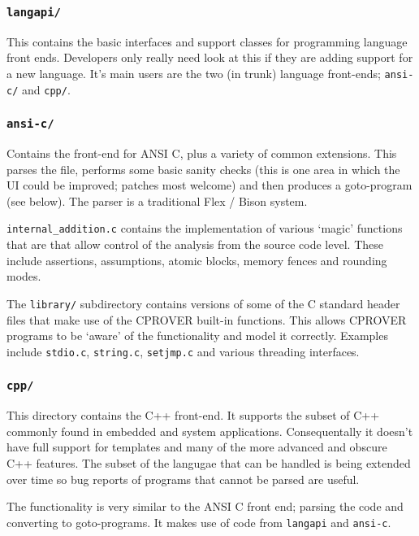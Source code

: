 \documentclass{article}
\newcommand{\dir}[1]{\texttt{#1}}
\newcommand{\file}[1]{\texttt{#1}}
\begin{document}
\subsubsection{\dir{langapi/}}

This contains the basic interfaces and support classes for programming
language front ends.  Developers only really need look at this if they
are adding support for a new language.  It's main users are the two
(in trunk) language front-ends; \dir{ansi-c/} and \dir{cpp/}.


\subsubsection{\dir{ansi-c/}}

Contains the front-end for ANSI C, plus a variety of common
extensions.  This parses the file, performs some basic sanity checks
(this is one area in which the UI could be improved; patches most
welcome) and then produces a goto-program (see below).  The parser is
a traditional Flex / Bison system.  

\file{internal\_addition.c} contains the implementation of various
`magic' functions that are that allow control of the analysis from the
source code level.  These include assertions, assumptions, atomic
blocks, memory fences and rounding modes.

The \dir{library/} subdirectory contains versions of some of the C
standard header files that make use of the CPROVER built-in
functions.  This allows CPROVER programs to be `aware' of the
functionality and model it correctly.  Examples include
\file{stdio.c}, \file{string.c}, \file{setjmp.c} and various threading
interfaces.


\subsubsection{\dir{cpp/}}

This directory contains the C++ front-end.  It supports the subset of
C++ commonly found in embedded and system applications.
Consequentally it doesn't have full support for templates and many of
the more advanced and obscure C++ features.  The subset of the
langugae that can be handled is being extended over time so bug
reports of programs that cannot be parsed are useful.

The functionality is very similar to the ANSI C front end; parsing the
code and converting to goto-programs.  It makes use of code from
\dir{langapi} and \dir{ansi-c}.
\end{document}
